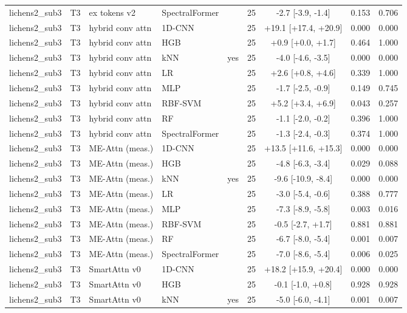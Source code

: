 \begin{tabular}{lllllcccc}
lichens2_sub3 & T3 & ex tokens v2 & SpectralFormer &  & 25 & -2.7 [-3.9, -1.4] & 0.153 & 0.706 \\
lichens2_sub3 & T3 & hybrid conv attn & 1D-CNN &  & 25 & +19.1 [+17.4, +20.9] & 0.000 & 0.000 \\
lichens2_sub3 & T3 & hybrid conv attn & HGB &  & 25 & +0.9 [+0.0, +1.7] & 0.464 & 1.000 \\
lichens2_sub3 & T3 & hybrid conv attn & kNN & yes & 25 & -4.0 [-4.6, -3.5] & 0.000 & 0.000 \\
lichens2_sub3 & T3 & hybrid conv attn & LR &  & 25 & +2.6 [+0.8, +4.6] & 0.339 & 1.000 \\
lichens2_sub3 & T3 & hybrid conv attn & MLP &  & 25 & -1.7 [-2.5, -0.9] & 0.149 & 0.745 \\
lichens2_sub3 & T3 & hybrid conv attn & RBF-SVM &  & 25 & +5.2 [+3.4, +6.9] & 0.043 & 0.257 \\
lichens2_sub3 & T3 & hybrid conv attn & RF &  & 25 & -1.1 [-2.0, -0.2] & 0.396 & 1.000 \\
lichens2_sub3 & T3 & hybrid conv attn & SpectralFormer &  & 25 & -1.3 [-2.4, -0.3] & 0.374 & 1.000 \\
lichens2_sub3 & T3 & ME-Attn (meas.) & 1D-CNN &  & 25 & +13.5 [+11.6, +15.3] & 0.000 & 0.000 \\
lichens2_sub3 & T3 & ME-Attn (meas.) & HGB &  & 25 & -4.8 [-6.3, -3.4] & 0.029 & 0.088 \\
lichens2_sub3 & T3 & ME-Attn (meas.) & kNN & yes & 25 & -9.6 [-10.9, -8.4] & 0.000 & 0.000 \\
lichens2_sub3 & T3 & ME-Attn (meas.) & LR &  & 25 & -3.0 [-5.4, -0.6] & 0.388 & 0.777 \\
lichens2_sub3 & T3 & ME-Attn (meas.) & MLP &  & 25 & -7.3 [-8.9, -5.8] & 0.003 & 0.016 \\
lichens2_sub3 & T3 & ME-Attn (meas.) & RBF-SVM &  & 25 & -0.5 [-2.7, +1.7] & 0.881 & 0.881 \\
lichens2_sub3 & T3 & ME-Attn (meas.) & RF &  & 25 & -6.7 [-8.0, -5.4] & 0.001 & 0.007 \\
lichens2_sub3 & T3 & ME-Attn (meas.) & SpectralFormer &  & 25 & -7.0 [-8.6, -5.4] & 0.006 & 0.025 \\
lichens2_sub3 & T3 & SmartAttn v0 & 1D-CNN &  & 25 & +18.2 [+15.9, +20.4] & 0.000 & 0.000 \\
lichens2_sub3 & T3 & SmartAttn v0 & HGB &  & 25 & -0.1 [-1.0, +0.8] & 0.928 & 0.928 \\
lichens2_sub3 & T3 & SmartAttn v0 & kNN & yes & 25 & -5.0 [-6.0, -4.1] & 0.001 & 0.007 \\

\end{tabular}
